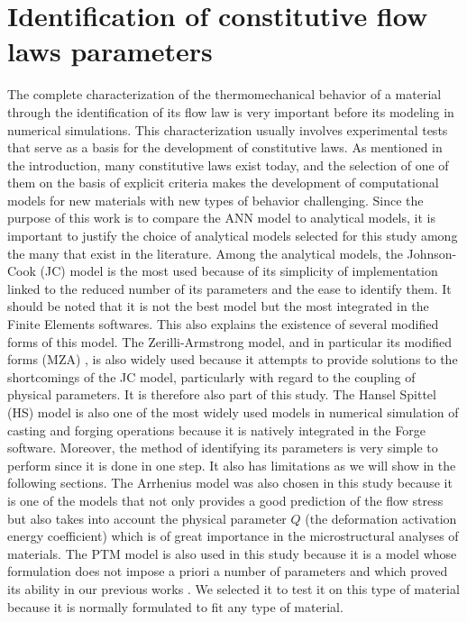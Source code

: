 \documentclass[twoside,english,1p,final,sort&compress]{elsarticle}
\theoremstyle{plain}
\begin{document}
\section{Identification of constitutive flow laws parameters\label{sec:ConstLaws}}

The complete characterization of the thermomechanical behavior of a material through the identification of its flow law is very important before its modeling in numerical simulations.
This characterization usually involves experimental tests that serve as a basis for the development of constitutive laws.
As mentioned in the introduction, many constitutive laws exist today, and the selection of one of them on the basis of explicit criteria makes the development of computational models for new materials with new types of behavior challenging.
Since the purpose of this work is to compare the ANN model to analytical models, it is important to justify the choice of analytical models selected for this study among the many that exist in the literature.
Among the analytical models, the Johnson-Cook (JC) model \cite{Johnson-1983} is the most used because of its simplicity of implementation linked to the reduced number of its parameters and the ease to identify them.
It should be noted that it is not the best model but the most integrated in the Finite Elements softwares.
This also explains the existence of several modified forms of this model.
The Zerilli-Armstrong model, and in particular its modified forms (MZA) \cite{NematNasser-2004, Lennon-2004, Muralli-2017, Cheng-2021, Muralli-2021}, is also widely used because it attempts to provide solutions to the shortcomings of the JC model, particularly with regard to the coupling of physical parameters.
It is therefore also part of this study.
The Hansel Spittel (HS) model \cite{Hensel-1978} is also one of the most widely used models in numerical simulation of casting and forging operations because it is natively integrated in the Forge software.
Moreover, the method of identifying its parameters is very simple to perform since it is done in one step.
It also has limitations as we will show in the following sections.
The Arrhenius model was also chosen in this study because it is one of the models that not only provides a good prediction of the flow stress but also takes into account the physical parameter $Q$ (the deformation activation energy coefficient) which is of great importance in the microstructural analyses of materials.
The PTM model \cite{TizeMha-2022} is also used in this study because it is a model whose formulation does not impose a priori a number of parameters and which proved its ability in our previous works \cite{TizeMha-2022}.
We selected it to test it on this type of material because it is normally formulated to fit any type of material.
\end{document}
